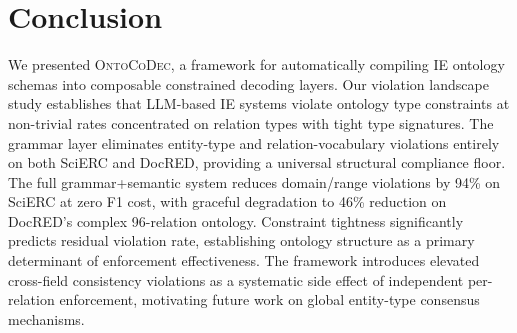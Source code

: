 \documentclass[11pt,a4paper]{article}
\begin{document}
\section{Conclusion}

We presented \textsc{OntoCoDec}, a framework for automatically compiling IE ontology schemas into composable constrained decoding layers.
Our violation landscape study establishes that LLM-based IE systems violate ontology type constraints at non-trivial rates concentrated on relation types with tight type signatures.
The grammar layer eliminates entity-type and relation-vocabulary violations entirely on both SciERC and DocRED, providing a universal structural compliance floor.
The full grammar+semantic system reduces domain/range violations by 94\% on SciERC at zero F1 cost, with graceful degradation to 46\% reduction on DocRED's complex 96-relation ontology.
Constraint tightness significantly predicts residual violation rate, establishing ontology structure as a primary determinant of enforcement effectiveness.
The framework introduces elevated cross-field consistency violations as a systematic side effect of independent per-relation enforcement, motivating future work on global entity-type consensus mechanisms.



\end{document}
